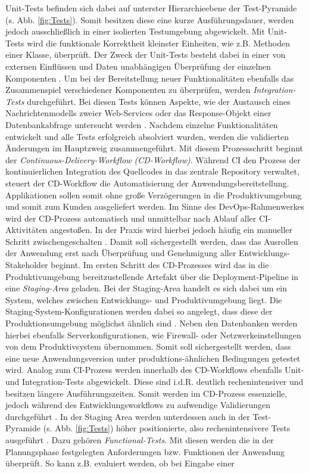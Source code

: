 \vspace*{-10mm}
Unit-Tests befinden sich dabei auf unterster Hierarchieebene der Test-Pyramide (s. Abb. \ref*{fig:Tests}). Somit besitzen diese eine kurze Ausführungsdauer, werden jedoch ausschließlich in einer isolierten Testumgebung abgewickelt. Mit Unit-Tests wird die funktionale Korrektheit kleinster Einheiten, wie z.B. Methoden einer Klasse, über\-prüft. Der Zweck der Unit-Tests besteht dabei in einer von externen Einflüssen und Daten unabhängigen Überprüfung der einzelnen Komponenten \cite[Kap. 2]{Hambling.2015}. Um bei der Bereitstellung neuer Funktionalitäten ebenfalls das Zusammenspiel verschiedener Komponenten zu überprüfen, werden \textit{Integration-Tests} durchgeführt. Bei diesen Tests können Aspekte, wie der Austausch eines Nachrichtenmodells zweier Web-Services oder das Response-Objekt einer Datenbankabfrage untersucht werden \cite[Kap. 2]{Hambling.2015}. Nachdem einzelne Funktionalitäten entwickelt und alle Tests erfolgreich absolviert wurden, werden die validierten Än\-derungen im Hauptzweig zusammengeführt. Mit diesem Prozessschritt beginnt der \textit{Continuous-Delivery-Workflow (\acs{CD}-Workflow)}.  Während CI den Prozess der kontinuierlichen Integration des Quellcodes in das zentrale Repository verwaltet, steuert der CD-Workflow die Automatisierung der Anwendungsbereitstellung. Applikationen sollen somit ohne große Verzögerungen in die Produktivumgebung und somit zum Kunden ausgeliefert werden. Im Sinne des DevOps-Rahmenwerkes wird der CD-Prozess automatisch und unmittelbar nach Ablauf aller CI-Aktivitäten angestoßen. In der Praxis wird hierbei jedoch häufig ein manueller Schritt zwischengeschalten \cite[20]{Halstenberg.2020}. Damit soll sichergestellt werden, dass das Ausrollen der Anwendung erst nach Überprüfung und Genehmigung aller Entwicklungs-Stakeholder beginnt. Im ersten Schritt des CD-Prozesses wird das in die Produktivumgebung bereitzustellende Artefakt über die Deployment-Pipeline in eine \textit{Staging-Area} geladen. Bei der Staging-Area handelt es sich dabei um ein System, welches zwischen Entwicklungs- und Produktivumgebung liegt. Die Staging-System-Konfigurationen werden dabei so angelegt, dass diese der Produktionsumgebung möglichst ähnlich sind \cite[Kap. 1.3]{Labouardy.2021}. Neben den Datenbanken werden hierbei ebenfalls Serverkonfigurationen, wie Firewall- oder Netzwerkeinstellungen von dem Produktivsystem übernommen. Somit soll sichergestellt werden, dass eine neue Anwendungsversion unter produktions-ähnlichen Bedingungen getestet wird. Analog zum CI-Prozess werden innerhalb des CD-Workflows ebenfalls Unit- und Integration-Tests abgewickelt. Diese sind i.d.R. deutlich rechenintensiver und besitzen längere Ausführungszeiten. Somit werden im CD-Prozess essenzielle, jedoch während des Entwicklungsworkflows zu aufwendige Validierungen durchgeführt \cite[20]{Halstenberg.2020}. In der Staging Area werden unterdessen auch in der Test-Pyramide (s. Abb. \ref*{fig:Tests}) höher positionierte, also rechenintensivere Tests ausgeführt \cite[Kap. 2]{Hambling.2015}. Dazu gehören \textit{Functional-Tests}. Mit diesen werden die in der Planungsphase festgelegten Anforderungen bzw. Funktionen der Anwendung überprüft. So kann z.B. evaluiert werden, ob bei Eingabe einer 